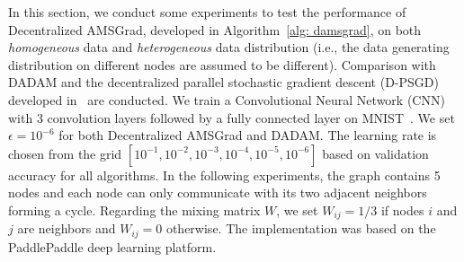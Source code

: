 \documentclass[11pt]{article}
\begin{document}
In this section, we conduct some experiments to test the performance of Decentralized AMSGrad, developed in Algorithm~\ref{alg: damsgrad}, on both \emph{homogeneous} data and \emph{heterogeneous} data distribution (i.e., the data generating distribution on different nodes are assumed to be different). 
Comparison with DADAM and the decentralized parallel stochastic gradient descent (D-PSGD) developed in~\cite{lian2017can} are conducted. 
We train a Convolutional Neural Network (CNN) with 3 convolution layers followed by a fully connected layer on MNIST~\citep{lecun1998mnist}.
We set $\epsilon = 10^{-6}$ for both Decentralized AMSGrad and DADAM.
The learning rate is chosen from the grid $[10^{-1}, 10^{-2}, 10^{-3}, 10^{-4}, 10^{-5}, 10^{-6}]$ based on validation accuracy for all algorithms. 
In the following experiments, the graph contains 5 nodes and each node can only communicate with its two adjacent neighbors forming a cycle.
Regarding the mixing matrix $W$, we set $W_{ij} = 1/3$ if nodes $i$ and $j$ are neighbors and $W_{ij} = 0$ otherwise. The implementation was based on the PaddlePaddle deep learning platform. 
\end{document}
